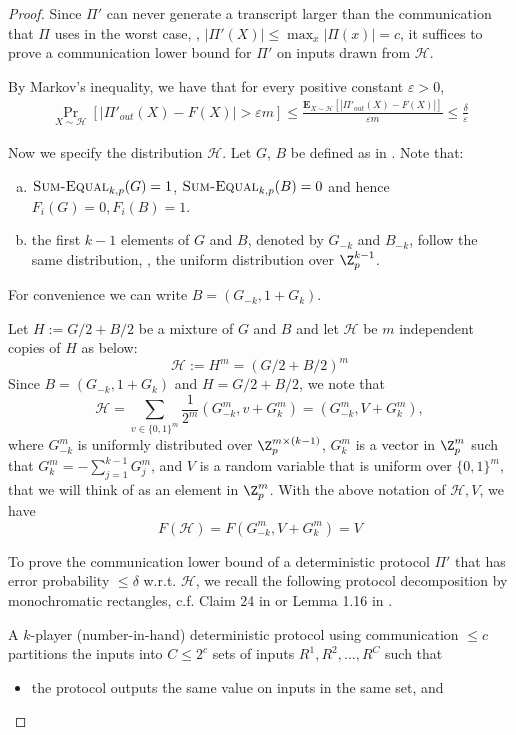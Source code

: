\documentclass{toc}
\newcommand{\follows}{\ensuremath{\sim}}
\newcommand{\zo}{\ensuremath{ \{ 0, 1 \} }}
\newcommand{\error}{\ensuremath{\delta}}
\newcommand{\gap}{\ensuremath{\varepsilon}}
\newcommand{\eqdef}{\ensuremath{:=}}
\newcommand{\E}{\ensuremath{\mathbf{E}}}
\newcommand{\sumequal}{\textsc{Sum-Equal} }
\begin{document}
\begin{proof}
		Since $\Pi'$ can never generate a transcript larger than the communication that $\Pi$ uses in the worst case, \ie, $|\Pi'(X)| \le  \max_x |\Pi(x)| =c$,
		it suffices to prove a communication lower bound for $\Pi'$ on inputs drawn from $\mathcal{H}$. 


		By Markov's inequality, we have that for every positive constant $\gap>0$,
		\begin{align}\label{ineq:Pi'}
		\Pr_{X\follows \mathcal{H}}\left[ \left| \Pi'_{out}(X) - F(X)\right| > \gap m \right] \le \frac{\E_{X\follows \mathcal{H}}\left[ \left| \Pi'_{out}(X) - F(X)\right| \right]}{\gap m}\le \frac{\error}{\gap}
		\end{align}



		Now we specify the distribution $\mathcal{H}$.
%
		Let $G$, $B$ be defined as in .	Note that:
%
%
\begin{enumerate}[(a)]  %
\item $\sumequal_{k,p}(G)=1$, $\sumequal_{k,p}(B)=0$ and hence $F_i(G)=0, F_i(B)=1$.
\item the first $k-1$ elements of $G$ and $B$, denoted by $G_{-k}$ and $B_{-k}$, follow the same distribution, \ie, the uniform distribution over $\Z_p^{k-1}$.
\end{enumerate}
%
%
		For convenience we can write $B=(G_{-k},1+G_k)$.

		Let $H\eqdef G/2+B/2$ be a mixture of $G$ and $B$ and let $\mathcal{H}$ be $m$ independent copies of $H$ as below:
		\[\mathcal{H} \eqdef H^m = \left(G/2+B/2\right)^m\]
		Since $B=(G_{-k},1+G_k)$ and $H=G/2+B/2$, we note that
		\[\mathcal{H} = \sum_{v\in\zo^m} \frac{1}{2^m} (G^m_{-k}, v+G^m_k)=(G^m_{-k}, V+G^m_k),\]
		where $G^m_{-k}$ is uniformly distributed over $\Z_p^{m\times (k-1)}$, $G_k^m$ is a vector in $\Z_p^m$ such that $G_k^m=-\sum_{j=1}^{k-1} G^m_j$, and $V$ is a random variable that is uniform over $\zo^m$, that we will think of as an element in  $\Z_p^m$.
		With the above notation of $\mathcal{H}, V$, we have
		\[F(\mathcal{H})=F(G^m_{-k}, V+G^m_k)=V\]

		To prove the communication lower bound of a deterministic protocol $\Pi'$ that has error probability $\le \error$ w.r.t. $\mathcal{H}$, 
		we recall the following protocol decomposition by monochromatic rectangles, c.f. Claim 24 in  \cite{Viola:2013we}  or Lemma 1.16 in \cite{kushilevitz1997communication}.

		\begin{claim}\label{claim: rectangle}
		A $k$-player (number-in-hand) deterministic protocol using communication $\le c$ partitions the inputs into $C\le 2^c $ sets of inputs $R^1,R^2,\ldots, R^C$ such that
			\begin{itemize}
				\item the protocol outputs the same value on inputs in the same set, and


\end{itemize}
\end{claim}
\end{proof}
\end{document}
